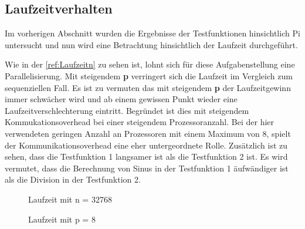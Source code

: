 \subsection{Laufzeitverhalten}
Im vorherigen Abschnitt wurden die Ergebnisse der Testfunktionen hinsichtlich Pi untersucht und nun wird eine Betrachtung hinsichtlich der Laufzeit durchgeführt.

Wie in der \autoref{ref:Laufzeitn} zu sehen ist, lohnt sich für diese Aufgabenstellung eine Parallelisierung.
Mit steigendem \textbf{p} verringert sich die Laufzeit im Vergleich zum sequenziellen Fall.
Es ist zu vermuten das mit steigendem \textbf{p} der Laufzeitgewinn immer schwächer wird und ab einem gewissen Punkt wieder eine Laufzeitverschlechterung eintritt.
Begründet ist dies mit steigendem Kommukationsoverhead bei einer steigendem Prozessoranzahl.
Bei der hier verwendeten geringen Anzahl an Prozessoren mit einem Maximum von 8, spielt der Kommunikationsoverhead eine eher untergeordnete Rolle.
Zusätzlich ist zu sehen, dass die Testfunktion 1 langsamer ist als die Testfunktion 2 ist.
Es wird vermutet, dass die Berechnung von Sinus in der Testfunktion 1 äufwändiger ist als die Division in der Testfunktion 2.
\begin{figure}[h]
\begin{minipage}{0.49\textwidth}
	\caption{Laufzeit mit n = 32768}
	\label{ref:Laufzeitn}
\end{minipage}
\hfill
\begin{minipage}{0.49\textwidth}
	\caption{Laufzeit mit p = 8}
	\label{ref:LaufzeitP}
\end{minipage}
\end{figure}

